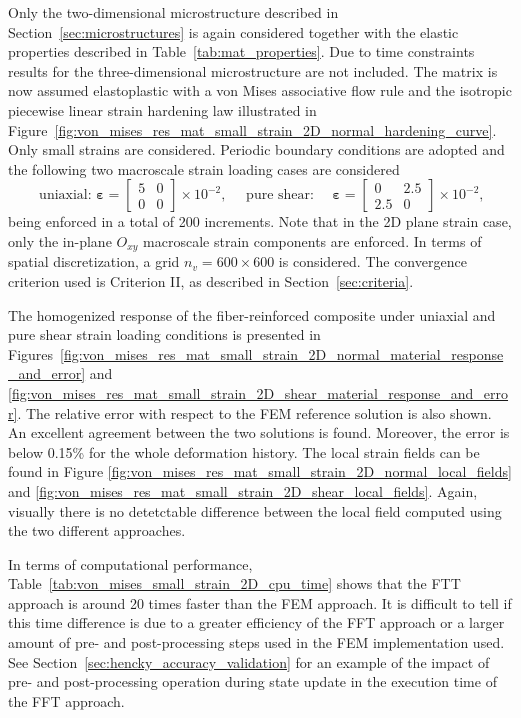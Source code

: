 Only the two-dimensional microstructure described in Section~\ref{sec:microstructures} is again considered together with the elastic properties described in Table~\ref{tab:mat_properties}.
Due to time constraints results for the three-dimensional microstructure are not included.
The matrix is now assumed elastoplastic with a von Mises associative flow rule and the isotropic piecewise linear strain hardening law illustrated in Figure~\ref{fig:von_mises_res_mat_small_strain_2D_normal_hardening_curve}.
Only small strains are considered.
Periodic boundary conditions are adopted and the following two macroscale strain loading cases are considered
\begin{equation}
\text { uniaxial: } \bm{\varepsilon}=\left[\begin{array}{cc}
5 & 0 \\
0 & 0
\end{array}\right] \times 10^{-2}, \quad \text { pure shear: } \quad \bm \varepsilon=\left[\begin{array}{cc}
0 & 2.5 \\
2.5 & 0
\end{array}\right] \times 10^{-2},
\end{equation}
being enforced in a total of 200 increments.
Note that in the 2D plane strain case, only the in-plane \(O_{x y}\) macroscale strain components are enforced.
In terms of spatial discretization, a grid \(n_{v}=600 \times 600\) is considered.
The convergence criterion used is Criterion II, as described in Section~\ref{sec:criteria}.

The homogenized response of the fiber-reinforced composite under uniaxial and pure shear strain loading conditions is presented in Figures~\ref{fig:von_mises_res_mat_small_strain_2D_normal_material_response_and_error} and \ref{fig:von_mises_res_mat_small_strain_2D_shear_material_response_and_error}.
The relative error with respect to the FEM reference solution is also shown.
An excellent agreement between the two solutions is found.
Moreover, the error is below 0.15\% for the whole deformation history.
The local strain fields can be found in Figure \ref{fig:von_mises_res_mat_small_strain_2D_normal_local_fields} and \ref{fig:von_mises_res_mat_small_strain_2D_shear_local_fields}.
Again, visually there is no detetctable difference between the local field computed using the two different approaches.

In terms of computational performance, Table~\ref{tab:von_mises_small_strain_2D_cpu_time} shows that the FTT approach is around 20 times faster than the FEM approach.
It is difficult to tell if this time difference is due to a greater efficiency of the FFT approach or a larger amount of pre- and post-processing steps used in the FEM implementation used.
See Section~\ref{sec:hencky_accuracy_validation} for an example of the impact of pre- and post-processing operation during state update in the execution time of the FFT approach.

